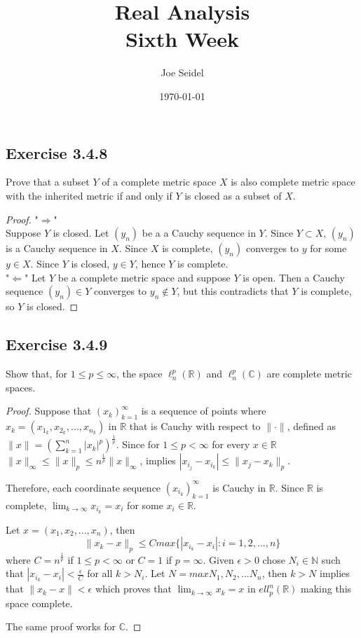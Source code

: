 \documentclass{tufte-book}
\title{Real Analysis\\Sixth Week }
\author{Joe Seidel}
\date{\today}
\theoremstyle{mytheoremstyle}
\theoremstyle{mylemstyle}
\theoremstyle{mydefstyle}
\begin{document}
\maketitle
{}
\newpage
{}

\subsection{Exercise 3.4.8}
Prove that a subset $Y$ of a complete metric space $X$ is also complete metric space with the inherited metric if and only if $Y$ is closed as a subset of $X$.

\begin{proof}"$\Rightarrow$"\\
Suppose $Y$ is closed. Let $(y_n)$ be a a Cauchy sequence in $Y$.  Since $Y \subset X$, $(y_n)$ is a Cauchy sequence in $X$.  Since $X$ is complete, $(y_n)$ converges to $y$ for some $y \in X$.  Since $Y$ is closed, $y \in Y$, hence $Y$ is complete.\\
"$\Leftarrow$" Let $Y$ be a complete metric space and suppose $Y$ is open.  Then a Cauchy sequence $(y_n) \in Y$ converges to $y_n \not\in Y$, but this contradicts that $Y$ is complete, so $Y$ is closed.

\end{proof}

\subsection{Exercise 3.4.9}
Show that, for $1 \leq p \leq \infty$, the space $\ell_n^p(\mathbb{R})$ and $\ell_n^p(\mathbb{C})$ are complete metric spaces.

\begin{proof}
Suppose that $(x_k)_{k=1}^\infty$ is a sequence of points where $x_k = (x_{1_{k}}, x_{2_{k}},...,x_{n_{k}})$ in $\mathbb{R}$ that is Cauchy with respect to $\|\cdot\|$, defined as $\|x\|=(\sum_{k=1}^n |x_k|^p)^\frac{1}{p}$.  Since for $1 \leq p < \infty$ for every $x \in \mathbb{R}$ $\|x\|_\infty \leq \|x\|_p \leq n^\frac{1}{p}\|x\|_\infty$, implies $|x_{i_j} - x_{i_k}| \leq \|x_j - x_k\|_p$.

Therefore, each coordinate sequence $(x_{i_k})_{k=1}^\infty$ is Cauchy in $\mathbb{R}$.  Since $\mathbb{R}$ is complete, $\lim_{k \to \infty}x_{i_k} = x_i$ for some $x_i \in \mathbb{R}$.

Let $x = (x_1, x_2,...,x_n)$, then
\[ \|x_k - x\|_p \leq C max\{|x_{i_k} - x_i|:i=1,2,...,n\} \]
where $C=n^\frac{1}{p}$ if $1 \leq p < \infty$ or $C=1$ if $p = \infty$.  Given $\epsilon >0$ chose $N_i \in \mathbb{N}$ such that $|x_{i_k} - x_i| < \frac{\epsilon}{C}$ for all $k > N_i$.  Let $N=max{N_1, N_2,...N_n}$, then $k>N$ implies that $\|x_k-x\| < \epsilon$ which proves that $\lim_{k \to \infty}x_k = x$ in $ell_p^n(\mathbb{R})$ making this space complete.

The same proof works for $\mathbb{C}$.
\end{proof}
\end{document}
